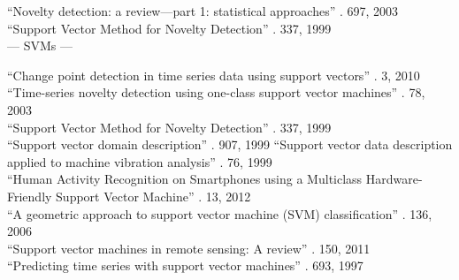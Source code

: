 ``Novelty detection: a review—part 1: statistical approaches'' \cite{markou2003novelty}. 697, 2003 \\

``Support Vector Method for Novelty Detection'' \cite{scholkopf1999support}. 337, 1999 \\

--- SVMs ---

``Change point detection in time series data using support vectors'' \cite{camci2010change}. 3, 2010 \\

``Time-series novelty detection using one-class support vector machines'' \cite{ma2003time}. 78, 2003 \\

``Support Vector Method for Novelty Detection'' \cite{scholkopf1999support}. 337, 1999 \\

``Support vector domain description'' \cite{tax1999support}. 907, 1999
``Support vector data description applied to machine vibration analysis'' \cite{tax1999supportdata}. 76, 1999 \\

``Human Activity Recognition on Smartphones using a Multiclass Hardware-Friendly Support Vector Machine'' \cite{anguitahuman}. 13, 2012 \\

``A geometric approach to support vector machine (SVM) classification'' \cite{mavroforakis2006geometric}. 136, 2006 \\

``Support vector machines in remote sensing: A review'' \cite{mountrakis2011support}. 150, 2011 \\

``Predicting time series with support vector machines'' \cite{muller1997predicting}. 693, 1997 \\

